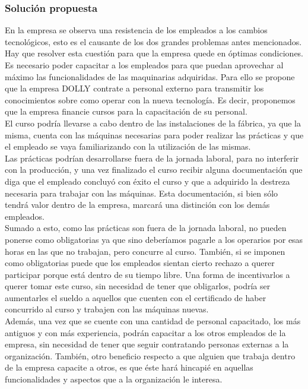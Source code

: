 \documentclass[a4paper,10pt,titlepage]{article}
\begin{document}
\subsubsection{Soluci\'on propuesta}
		\indent En la empresa se observa una resistencia de los empleados a los cambios tecnol\'ogicos, esto es el causante de los dos grandes problemas antes mencionados. Hay que resolver esta cuesti\'on para que la empresa quede en \'optimas condiciones.\\
		\indent Es necesario poder capacitar a los empleados para que puedan aprovechar al máximo las funcionalidades de las maquinarias adquiridas. Para ello se propone que la empresa DOLLY contrate a personal externo para transmitir los conocimientos sobre como operar con la nueva tecnología. Es decir, proponemos que la empresa financie cursos para la capacitación de su personal. \\
		\indent El curso podría llevarse a cabo dentro de las instalaciones de la fábrica, ya que la misma, cuenta con las máquinas necesarias para poder realizar las prácticas y que el empleado se vaya familiarizando con la utilización de las mismas.\\
		\indent Las prácticas podrían desarrollarse fuera de la jornada laboral, para no interferir con la producción, y una vez finalizado el curso recibir alguna documentación que diga que el empleado concluyó con éxito el curso y que a adquirido la destreza necesaria para trabajar con las máquinas. Esta documentación, si bien sólo tendrá valor dentro de la empresa, marcará una distinción con los demás empleados.\\
		\indent Sumado a esto, como las prácticas son fuera de la jornada laboral, no pueden ponerse como obligatorias ya que sino deberíamos pagarle a los operarios por esas  horas en las que no trabajan, pero concurre al curso. También, si se imponen como obligatorias puede que los empleados sientan cierto rechazo a  querer participar porque está dentro de su tiempo libre. Una forma de incentivarlos a querer tomar este curso, sin necesidad de tener que obligarlos, podría ser aumentarles el sueldo a aquellos que cuenten con el certificado de haber concurrido al curso y trabajen con las máquinas nuevas.\\
		\indent Además, una vez que se cuente con una cantidad de personal capacitado, los más antiguos y con más experiencia, podrán capacitar a los otros empleados de la empresa, sin necesidad de tener que seguir contratando personas externas a la organización. También, otro beneficio respecto a que alguien que trabaja dentro de la empresa capacite a otros, es que éste hará hincapié en aquellas funcionalidades y aspectos que a la organización le interesa. \\
\end{document}
